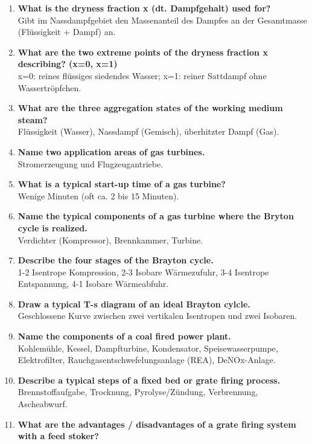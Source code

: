 \documentclass{article}
\begin{document}
\begin{enumerate}
    Der reale Prozess beinhaltet Verluste: Druckverluste in Rohren und eine nicht-isentrope (verlustbehaftete) Expansion in der Turbine.
    \item \textbf{What is the dryness fraction x (dt. Dampfgehalt) used for?} \\
    Gibt im Nassdampfgebiet den Massenanteil des Dampfes an der Gesamtmasse (Flüssigkeit + Dampf) an.
    \item \textbf{What are the two extreme points of the dryness fraction x describing? (x=0, x=1)} \\
    x=0: reines flüssiges siedendes Wasser; x=1: reiner Sattdampf ohne Wassertröpfchen.
    \item \textbf{What are the three aggregation states of the working medium steam?} \\
    Flüssigkeit (Wasser), Nassdampf (Gemisch), überhitzter Dampf (Gas).
    \item \textbf{Name two application areas of gas turbines.} \\
    Stromerzeugung und Flugzeugantriebe.
    \item \textbf{What is a typical start-up time of a gas turbine?} \\
    Wenige Minuten (oft ca. 2 bis 15 Minuten).
    \item \textbf{Name the typical components of a gas turbine where the Bryton cycle is realized.} \\
    Verdichter (Kompressor), Brennkammer, Turbine.
    \item \textbf{Describe the four stages of the Brayton cycle.} \\
    1-2 Isentrope Kompression, 2-3 Isobare Wärmezufuhr, 3-4 Isentrope Entspannung, 4-1 Isobare Wärmeabfuhr.
    \item \textbf{Draw a typical T-s diagram of an ideal Brayton cylcle.} \\
    Geschlossene Kurve zwischen zwei vertikalen Isentropen und zwei Isobaren.
    \item \textbf{Name the components of a coal fired power plant.} \\
    Kohlemühle, Kessel, Dampfturbine, Kondensator, Speisewasserpumpe, Elektrofilter, Rauchgasentschwefelungsanlage (REA), DeNOx-Anlage.
    \item \textbf{Describe a typical steps of a fixed bed or grate firing process.} \\
    Brennstoffaufgabe, Trocknung, Pyrolyse/Zündung, Verbrennung, Ascheabwurf.
    \item \textbf{What are the advantages / disadvantages of a grate firing system with a feed stoker?} \\

\end{enumerate}
\end{document}
